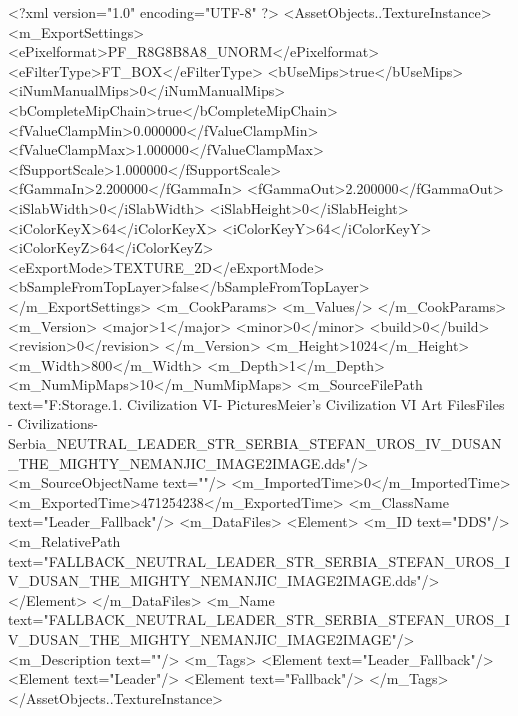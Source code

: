 <?xml version="1.0" encoding="UTF-8" ?>
<AssetObjects..TextureInstance>
	<m_ExportSettings>
		<ePixelformat>PF_R8G8B8A8_UNORM</ePixelformat>
		<eFilterType>FT_BOX</eFilterType>
		<bUseMips>true</bUseMips>
		<iNumManualMips>0</iNumManualMips>
		<bCompleteMipChain>true</bCompleteMipChain>
		<fValueClampMin>0.000000</fValueClampMin>
		<fValueClampMax>1.000000</fValueClampMax>
		<fSupportScale>1.000000</fSupportScale>
		<fGammaIn>2.200000</fGammaIn>
		<fGammaOut>2.200000</fGammaOut>
		<iSlabWidth>0</iSlabWidth>
		<iSlabHeight>0</iSlabHeight>
		<iColorKeyX>64</iColorKeyX>
		<iColorKeyY>64</iColorKeyY>
		<iColorKeyZ>64</iColorKeyZ>
		<eExportMode>TEXTURE_2D</eExportMode>
		<bSampleFromTopLayer>false</bSampleFromTopLayer>
	</m_ExportSettings>
	<m_CookParams>
		<m_Values/>
	</m_CookParams>
	<m_Version>
		<major>1</major>
		<minor>0</minor>
		<build>0</build>
		<revision>0</revision>
	</m_Version>
	<m_Height>1024</m_Height>
	<m_Width>800</m_Width>
	<m_Depth>1</m_Depth>
	<m_NumMipMaps>10</m_NumMipMaps>
	<m_SourceFilePath text="F:\Mod Storage\2.1. Civilization VI\Mods\Archive - Pictures\Sid Meier's Civilization VI Art Files\Art Files - Civilizations\Civilization - Serbia\FALLBACK_NEUTRAL_LEADER_STR_SERBIA_STEFAN_UROS_IV_DUSAN_THE_MIGHTY_NEMANJIC_IMAGE2IMAGE.dds"/>
	<m_SourceObjectName text=""/>
	<m_ImportedTime>0</m_ImportedTime>
	<m_ExportedTime>471254238</m_ExportedTime>
	<m_ClassName text="Leader_Fallback"/>
	<m_DataFiles>
		<Element>
			<m_ID text="DDS"/>
			<m_RelativePath text="FALLBACK_NEUTRAL_LEADER_STR_SERBIA_STEFAN_UROS_IV_DUSAN_THE_MIGHTY_NEMANJIC_IMAGE2IMAGE.dds"/>
		</Element>
	</m_DataFiles>
	<m_Name text="FALLBACK_NEUTRAL_LEADER_STR_SERBIA_STEFAN_UROS_IV_DUSAN_THE_MIGHTY_NEMANJIC_IMAGE2IMAGE"/>
	<m_Description text=""/>
	<m_Tags>
		<Element text="Leader_Fallback"/>
		<Element text="Leader"/>
		<Element text="Fallback"/>
	</m_Tags>
</AssetObjects..TextureInstance>

